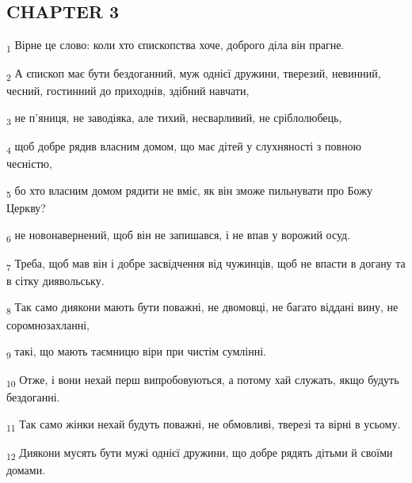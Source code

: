 \subsection{CHAPTER 3}
\begin{tcolorbox}
\textsubscript{1} Вірне це слово: коли хто єпископства хоче, доброго діла він прагне.
\end{tcolorbox}
\begin{tcolorbox}
\textsubscript{2} А єпископ має бути бездоганний, муж однієї дружини, тверезий, невинний, чесний, гостинний до приходнів, здібний навчати,
\end{tcolorbox}
\begin{tcolorbox}
\textsubscript{3} не п'яниця, не заводіяка, але тихий, несварливий, не сріблолюбець,
\end{tcolorbox}
\begin{tcolorbox}
\textsubscript{4} щоб добре рядив власним домом, що має дітей у слухняності з повною чесністю,
\end{tcolorbox}
\begin{tcolorbox}
\textsubscript{5} бо хто власним домом рядити не вміє, як він зможе пильнувати про Божу Церкву?
\end{tcolorbox}
\begin{tcolorbox}
\textsubscript{6} не новонавернений, щоб він не запишався, і не впав у ворожий осуд.
\end{tcolorbox}
\begin{tcolorbox}
\textsubscript{7} Треба, щоб мав він і добре засвідчення від чужинців, щоб не впасти в догану та в сітку диявольську.
\end{tcolorbox}
\begin{tcolorbox}
\textsubscript{8} Так само диякони мають бути поважні, не двомовці, не багато віддані вину, не соромнозахланні,
\end{tcolorbox}
\begin{tcolorbox}
\textsubscript{9} такі, що мають таємницю віри при чистім сумлінні.
\end{tcolorbox}
\begin{tcolorbox}
\textsubscript{10} Отже, і вони нехай перш випробовуються, а потому хай служать, якщо будуть бездоганні.
\end{tcolorbox}
\begin{tcolorbox}
\textsubscript{11} Так само жінки нехай будуть поважні, не обмовливі, тверезі та вірні в усьому.
\end{tcolorbox}
\begin{tcolorbox}
\textsubscript{12} Диякони мусять бути мужі однієї дружини, що добре рядять дітьми й своїми домами.
\end{tcolorbox}
